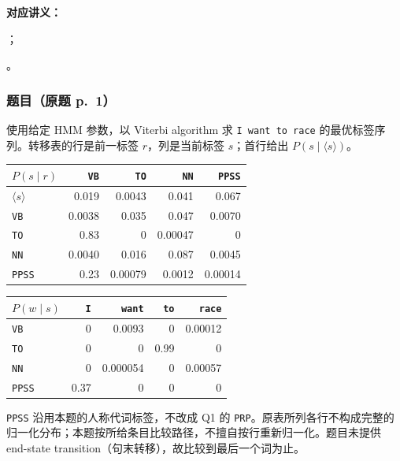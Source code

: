 
\textbf{对应讲义：}\par
{}；\par
{}。

\subsubsection*{题目（原题 p.~1）}

使用给定 HMM 参数，以 Viterbi algorithm 求 \texttt{I want to race} 的最优标签序列。转移表的行是前一标签 $r$，列是当前标签 $s$；首行给出 $P(s\mid\langle s\rangle)$。
\begin{center}
\begin{tabular}{@{}lrrrr@{}}
\toprule
$P(s\mid r)$ & \texttt{VB} & \texttt{TO} & \texttt{NN} & \texttt{PPSS} \\
\midrule
$\langle s\rangle$ & 0.019 & 0.0043 & 0.041 & 0.067 \\
\texttt{VB}   & 0.0038 & 0.035 & 0.047 & 0.0070 \\
\texttt{TO}   & 0.83 & 0 & 0.00047 & 0 \\
\texttt{NN}   & 0.0040 & 0.016 & 0.087 & 0.0045 \\
\texttt{PPSS} & 0.23 & 0.00079 & 0.0012 & 0.00014 \\
\bottomrule
\end{tabular}
\qquad
\begin{tabular}{@{}lrrrr@{}}
\toprule
$P(w\mid s)$ & \texttt{I} & \texttt{want} & \texttt{to} & \texttt{race} \\
\midrule
\texttt{VB}   & 0 & 0.0093 & 0 & 0.00012 \\
\texttt{TO}   & 0 & 0 & 0.99 & 0 \\
\texttt{NN}   & 0 & 0.000054 & 0 & 0.00057 \\
\texttt{PPSS} & 0.37 & 0 & 0 & 0 \\
\bottomrule
\end{tabular}
\end{center}
\texttt{PPSS} 沿用本题的人称代词标签，不改成 Q1 的 \texttt{PRP}。原表所列各行不构成完整的归一化分布；本题按所给条目比较路径，不擅自按行重新归一化。题目未提供 end-state transition（句末转移），故比较到最后一个词为止。

